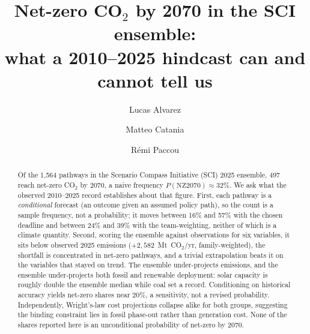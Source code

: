 \documentclass[sigconf, nonacm]{acmart}
\begin{document}
\title{Net-zero CO$_2$ by 2070 in the SCI ensemble:\\ what a 2010--2025 hindcast can and cannot tell us}

\author{Lucas Alvarez}

\author{Matteo Catania}

\author{R\'emi Paccou}

\begin{abstract}
Of the 1{,}564 pathways in the Scenario Compass Initiative (SCI) 2025 ensemble, 497 reach net-zero CO$_2$ by 2070, a naive frequency $P(\text{NZ2070})\approx 32\%$. We ask what the observed 2010--2025 record establishes about that figure. First, each pathway is a \emph{conditional} forecast (an outcome given an assumed policy path), so the count is a sample frequency, not a probability; it moves between 16\% and 57\% with the chosen deadline and between 24\% and 39\% with the team-weighting, neither of which is a climate quantity. Second, scoring the ensemble against observations for six variables, it sits below observed 2025 emissions ($+2{,}582$~Mt~CO$_2$/yr, family-weighted), the shortfall is concentrated in net-zero pathways, and a trivial extrapolation beats it on the variables that stayed on trend. The ensemble under-projects emissions, and the ensemble under-projects both fossil and renewable deployment: solar capacity is roughly double the ensemble median while coal set a record. Conditioning on historical accuracy yields net-zero shares near 20\%, a sensitivity, not a revised probability. Independently, Wright's-law cost projections collapse alike for both groups, suggesting the binding constraint lies in fossil phase-out rather than generation cost. None of the shares reported here is an unconditional probability of net-zero by 2070.
\end{abstract}


\maketitle

\end{document}
